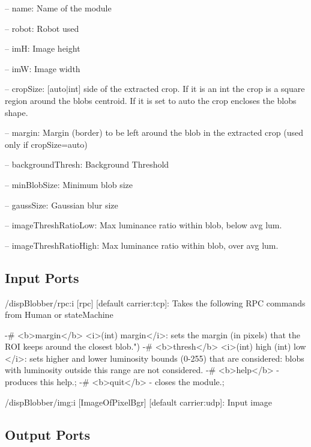 \begin{DoxyItemize}
\item -- name\+: Name of the module
\item -- robot\+: Robot used
\item -- imH\+: Image height
\item -- imW\+: Image width
\item -- crop\+Size\+: \mbox{[}auto$\vert$int\mbox{]} side of the extracted crop. If it is an int the crop is a square region around the blob\textquotesingle{}s centroid. If it is set to \textquotesingle{}auto\textquotesingle{} the crop encloses the blob\textquotesingle{}s shape.
\item -- margin\+: Margin (border) to be left around the blob in the extracted crop (used only if crop\+Size=\textquotesingle{}auto\textquotesingle{})
\item -- background\+Thresh\+: Background Threshold
\item -- min\+Blob\+Size\+: Minimum blob size
\item -- gauss\+Size\+: Gaussian blur size
\item -- image\+Thresh\+Ratio\+Low\+: Max luminance ratio within blob, below avg lum.
\item -- image\+Thresh\+Ratio\+High\+: Max luminance ratio within blob, over avg lum. 
\end{DoxyItemize}\hypertarget{group__seg2cloud_inputports_sec}{}\subsection{Input Ports}\label{group__seg2cloud_inputports_sec}

\begin{DoxyItemize}
\item /disp\+Blobber/rpc\+:i \mbox{[}rpc\mbox{]} \mbox{[}default carrier\+:tcp\mbox{]}\+: Takes the following R\+PC commands from Human or state\+Machine \begin{DoxyVerb}       -# <b>margin</b> <i>(int) margin</i>: sets the margin (in pixels) that the ROI keeps around the closest blob.")
       -# <b>thresh</b> <i>(int) high (int) low </i>: sets higher and lower luminosity bounds (0-255) that are considered: blobs with luminosity outside this range are not considered.
       -# <b>help</b> - produces this help.;
       -# <b>quit</b> - closes the module.;
\end{DoxyVerb}

\item /disp\+Blobber/img\+:i \mbox{[}Image\+Of\+Pixel\+Bgr\mbox{]} \mbox{[}default carrier\+:udp\mbox{]}\+: Input image
\end{DoxyItemize}\hypertarget{group__seg2cloud_outputports_sec}{}\subsection{Output Ports}\label{group__seg2cloud_outputports_sec}

